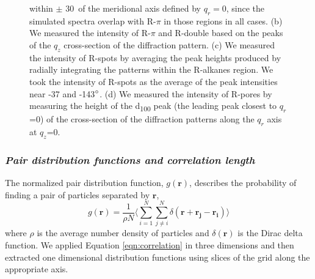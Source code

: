 \documentclass[journal=jpcbfk,manuscript=article]{achemso}
\begin{document}
\begin{figure}[!htb]
{  within $\pm$ 30\degree~of the meridional axis defined by $q_r=0$, since the 
  simulated spectra overlap with R-$\pi$ in those regions in all cases. (b) We
  measured the intensity of R-$\pi$ and R-double based on the peaks of the $q_z$
  cross-section of the diffraction pattern. (c) We measured the intensity of R-spots
  by averaging the peak heights produced by radially integrating the patterns within 
  the R-alkanes region. We took the intensity of R-spots as the average of the 
  peak intensities near -37 and -143$\degree$. (d) We measured the intensity of 
  R-pores by measuring the height of the d\textsubscript{100} peak (the leading
  peak closest to $q_r$=0) of the cross-section of the diffraction patterns along
  the $q_r$ axis at $q_z$=0.} \label{fig:xrd_intensities}
  \end{figure}
 
  \subsubsection{\textit{Pair distribution functions and correlation length}}\label{section:correlation_length}

  The normalized pair distribution function, $g(\mathbf{r})$, describes
  the probability of finding a pair of particles separated by $\mathbf{r}$,
  \begin{equation}
	g(\mathbf{r})= \frac{1}{\rho N} \Bigg \langle \sum_{i=1}^{N}\sum_{j\neq i}^{N} \delta(\mathbf{r}+\mathbf{r_j}-\mathbf{r_i}) \Bigg \rangle
	\label{eqn:correlation}
  \end{equation}
  where $\rho$ is the average number density of particles and
  $\delta(\mathbf{r})$ is the Dirac delta function\cite{kuriabova_linear_2010}.
  We applied Equation \ref{eqn:correlation} in three dimensions and then
  extracted one dimensional distribution functions using slices of the grid
  along the appropriate axis.
\end{document}
